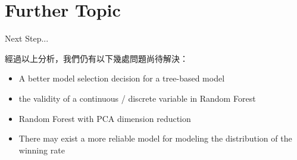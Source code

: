 \documentclass[12pt]{beamer}
\begin{document}
\section{Further Topic}

\begin{frame}[fragile]{Next Step...}

	經過以上分析，我們仍有以下幾處問題尚待解決：

	\begin{itemize}
		\item A better model selection decision for a tree-based model
		\item the validity of a continuous / discrete variable in Random Forest
		\item Random Forest with PCA dimension reduction
		\item There may exist a more reliable model for modeling the distribution of the winning rate
	\end{itemize}

\end{frame}
\end{document}
